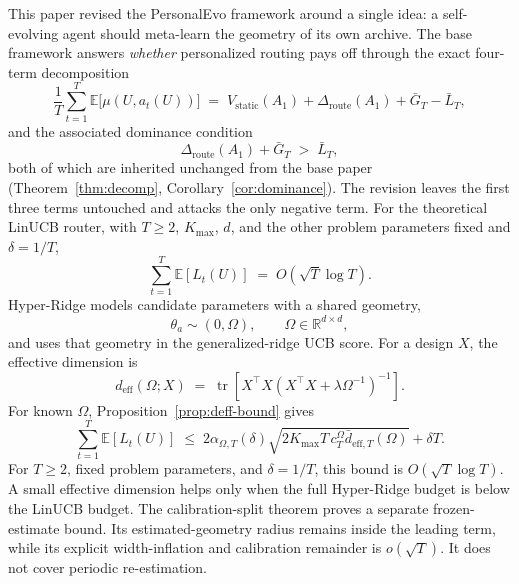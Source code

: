 \documentclass{article} %
\providecommand{\E}{\mathbb{E}}
\begin{document}
\label{sec:conclusion}

This paper revised the PersonalEvo framework around a single idea: a self-evolving agent should meta-learn the geometry of its own archive. The base framework answers \emph{whether} personalized routing pays off through the exact four-term decomposition
\begin{equation}
\label{eq:conc-decomp}
\frac{1}{T}\sum_{t=1}^{T}\E\bigl[\mu(U,a_t(U))\bigr]
\;=\;
V_{\mathrm{static}}(A_1)
+ \Delta_{\mathrm{route}}(A_1)
+ \bar G_T
- \bar L_T,
\end{equation}
and the associated dominance condition
\begin{equation}
\label{eq:conc-dom}
\Delta_{\mathrm{route}}(A_1) + \bar G_T \;>\; \bar L_T,
\end{equation}
both of which are inherited unchanged from the base paper
(Theorem~\ref{thm:decomp}, Corollary~\ref{cor:dominance}). The revision leaves
the first three terms untouched and attacks the only negative term. For the
theoretical LinUCB router, with \(T\ge2\), \(K_{\max}\), \(d\), and the other
problem parameters fixed and \(\delta=1/T\),
\begin{equation}
\label{eq:conc-base-rate}
\sum_{t=1}^{T}\E[L_t(U)]
\;=\;
O\!\left(\sqrt{T}\log T\right).
\end{equation}
Hyper-Ridge models candidate parameters with a shared geometry,
\begin{equation}
\label{eq:conc-random-effects}
\theta_a \sim (0,\Omega), \qquad \Omega \in \mathbb{R}^{d\times d},
\end{equation}
and uses that geometry in the generalized-ridge UCB score. For a design \(X\),
the effective dimension is
\begin{equation}
\label{eq:conc-deff}
d_{\mathrm{eff}}(\Omega;X)
\;=\;
\operatorname{tr}\!\left[
X^\top X \left(X^\top X + \lambda \Omega^{-1}\right)^{-1}
\right].
\end{equation}
For known \(\Omega\), Proposition~\ref{prop:deff-bound} gives
\begin{equation}
\label{eq:conc-hyper-rate}
\sum_{t=1}^{T}\E[L_t(U)]
\;\le\;
2\alpha_{\Omega,T}(\delta)
\sqrt{
2K_{\max}T\,c_T^\Omega
\bar d_{\mathrm{eff},T}(\Omega)}
+\delta T.
\end{equation}
For \(T\ge2\), fixed problem parameters, and \(\delta=1/T\), this bound is
\(O(\sqrt{T}\log T)\). A small effective dimension helps only when the full
Hyper-Ridge budget is below the LinUCB budget. The calibration-split theorem
proves a separate frozen-estimate bound. Its estimated-geometry radius remains
inside the leading term, while its explicit width-inflation and calibration
remainder is \(o(\sqrt T)\). It does not cover periodic re-estimation.
\end{document}
